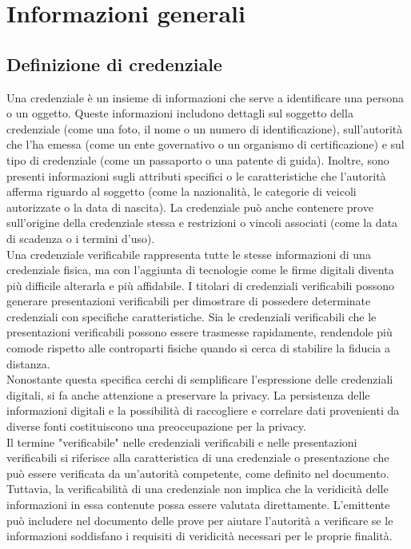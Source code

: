 \section{Informazioni generali}
\subsection{Definizione di credenziale}
Una credenziale è un insieme di informazioni che serve a identificare una persona o un oggetto. Queste informazioni includono dettagli sul soggetto della credenziale (come una foto, il nome o un numero di identificazione), sull'autorità che l'ha emessa (come un ente governativo o un organismo di certificazione) e sul tipo di credenziale (come un passaporto o una patente di guida). Inoltre, sono presenti informazioni sugli attributi specifici o le caratteristiche che l'autorità afferma riguardo al soggetto (come la nazionalità, le 
categorie di veicoli autorizzate o la data di nascita). La credenziale può anche contenere prove sull'origine della credenziale stessa e restrizioni o vincoli associati (come la data 
di scadenza o i termini d'uso).\\
Una credenziale verificabile rappresenta tutte le stesse informazioni di una credenziale fisica, ma con l'aggiunta di tecnologie come le firme digitali diventa più difficile alterarla e più affidabile. I titolari di credenziali verificabili possono generare presentazioni verificabili per dimostrare di possedere determinate credenziali con specifiche caratteristiche. 
Sia le credenziali verificabili che le presentazioni verificabili possono essere trasmesse rapidamente, rendendole più comode rispetto alle controparti fisiche quando si cerca di 
stabilire la fiducia a distanza.\\
Nonostante questa specifica cerchi di semplificare l'espressione delle credenziali digitali, si fa anche attenzione a preservare la privacy. La persistenza delle informazioni 
digitali e la possibilità di raccogliere e correlare dati provenienti da diverse fonti costituiscono una preoccupazione per la privacy.\\
Il termine "verificabile" nelle credenziali verificabili e nelle presentazioni verificabili si riferisce alla caratteristica di una credenziale o presentazione che può essere 
verificata da un'autorità competente, come definito nel documento. Tuttavia, la verificabilità di una credenziale non implica che la veridicità delle informazioni in essa 
contenute possa essere valutata direttamente. L'emittente può includere nel documento delle prove per aiutare l'autorità a verificare se le informazioni soddisfano i requisiti 
di veridicità necessari per le proprie finalità.

